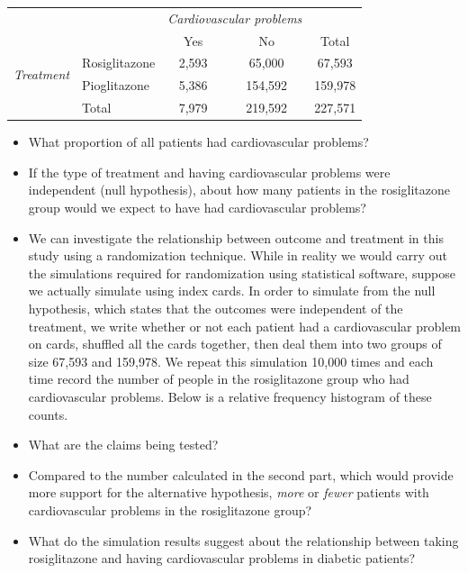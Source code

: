 \begin{center}


\begin{tabular}{ll cc c} 


& & \multicolumn{2}{c}{\textit{Cardiovascular problems}} \\


\cline{3-4} 


& & Yes & No & Total \\


\cline{2-5}


\multirow{2}{*}{\textit{Treatment}} & Rosiglitazone & 2,593 & 65,000 & 67,593 \\


& Pioglitazone & 5,386 & 154,592 & 159,978\\


\cline{2-5}


&Total & 7,979 & 219,592 & 227,571


\end{tabular}


\end{center}


\begin{itemize}


\item What proportion of all patients had cardiovascular problems?


\item If the type of treatment and having cardiovascular problems were independent (null hypothesis), about how many patients in the rosiglitazone group would we expect to have had cardiovascular problems?


\item We can investigate the relationship between outcome and treatment in this study using a randomization technique. While in reality we would carry out the simulations required for randomization using statistical software, suppose we actually simulate using index cards. In order to simulate from the null hypothesis, which states that the outcomes were independent of the treatment, we write whether or not each patient had a cardiovascular problem on cards, shuffled all the cards together, then deal them into two groups of size 67,593 and 159,978. We repeat this simulation 10,000 times and each time record the number of people in the rosiglitazone group who had cardiovascular problems. Below is a relative frequency histogram of these counts.


\item What are the claims being tested?


\item Compared to the number calculated in the second part, which would provide more support for the alternative hypothesis, \textit{more} or \textit{fewer} patients with cardiovascular problems in the rosiglitazone group?


\item What do the simulation results suggest about the relationship between taking rosiglitazone and having cardiovascular problems in diabetic patients?


\end{itemize}


